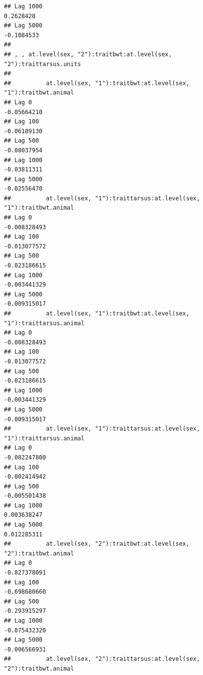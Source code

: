 \documentclass[
  12pt,
]{book}
\begin{document}
\begin{verbatim}
## Lag 1000                                                           0.2628428
## Lag 5000                                                          -0.1084533
## 
## , , at.level(sex, "2"):traitbwt:at.level(sex, "2"):traittarsus.units
## 
##          at.level(sex, "1"):traitbwt:at.level(sex, "1"):traitbwt.animal
## Lag 0                                                       -0.05664210
## Lag 100                                                     -0.06189130
## Lag 500                                                     -0.08037954
## Lag 1000                                                    -0.03811311
## Lag 5000                                                    -0.02556470
##          at.level(sex, "1"):traittarsus:at.level(sex, "1"):traitbwt.animal
## Lag 0                                                         -0.008328493
## Lag 100                                                       -0.013077572
## Lag 500                                                       -0.023186615
## Lag 1000                                                      -0.003441329
## Lag 5000                                                      -0.009315017
##          at.level(sex, "1"):traitbwt:at.level(sex, "1"):traittarsus.animal
## Lag 0                                                         -0.008328493
## Lag 100                                                       -0.013077572
## Lag 500                                                       -0.023186615
## Lag 1000                                                      -0.003441329
## Lag 5000                                                      -0.009315017
##          at.level(sex, "1"):traittarsus:at.level(sex, "1"):traittarsus.animal
## Lag 0                                                            -0.002247800
## Lag 100                                                          -0.002414942
## Lag 500                                                          -0.005501438
## Lag 1000                                                          0.003638247
## Lag 5000                                                          0.012285311
##          at.level(sex, "2"):traitbwt:at.level(sex, "2"):traitbwt.animal
## Lag 0                                                      -0.827378091
## Lag 100                                                    -0.698680660
## Lag 500                                                    -0.293915297
## Lag 1000                                                   -0.075432320
## Lag 5000                                                   -0.006566931
##          at.level(sex, "2"):traittarsus:at.level(sex, "2"):traitbwt.animal

\end{verbatim}
\end{document}
